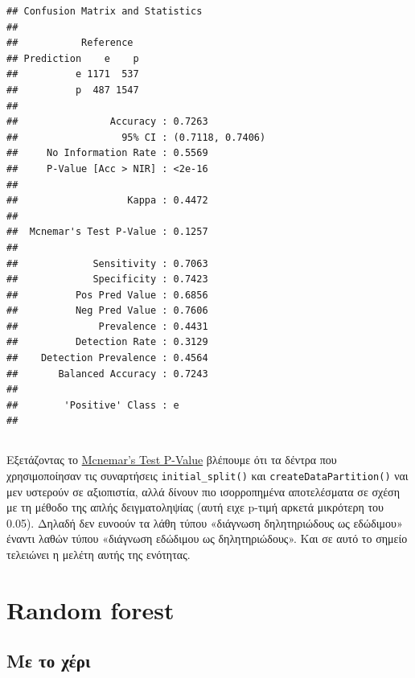 \documentclass[
]{article}
\begin{document}
\begin{verbatim}
## Confusion Matrix and Statistics
## 
##           Reference
## Prediction    e    p
##          e 1171  537
##          p  487 1547
##                                           
##                Accuracy : 0.7263          
##                  95% CI : (0.7118, 0.7406)
##     No Information Rate : 0.5569          
##     P-Value [Acc > NIR] : <2e-16          
##                                           
##                   Kappa : 0.4472          
##                                           
##  Mcnemar's Test P-Value : 0.1257          
##                                           
##             Sensitivity : 0.7063          
##             Specificity : 0.7423          
##          Pos Pred Value : 0.6856          
##          Neg Pred Value : 0.7606          
##              Prevalence : 0.4431          
##          Detection Rate : 0.3129          
##    Detection Prevalence : 0.4564          
##       Balanced Accuracy : 0.7243          
##                                           
##        'Positive' Class : e               
## 
\end{verbatim}

\subsection*{}\label{section-3}

Εξετάζοντας το
\href{https://rasbt.github.io/mlxtend/user_guide/evaluate/mcnemar/}{Mcnemar's
Test P-Value} βλέπουμε ότι τα δέντρα που χρησιμοποίησαν τις συναρτήσεις
\texttt{initial\_split()} και \texttt{createDataPartition()} ναι μεν
υστερούν σε αξιοπιστία, αλλά δίνουν πιο ισορροπημένα αποτελέσματα σε
σχέση με τη μέθοδο της απλής δειγματοληψίας (αυτή ειχε p-τιμή αρκετά
μικρότερη του 0.05). Δηλαδή δεν ευνοούν τα λάθη τύπου «διάγνωση
δηλητηριώδους ως εδώδιμου» έναντι λαθών τύπου «διάγνωση εδώδιμου ως
δηλητηριώδους». Και σε αυτό το σημείο τελειώνει η μελέτη αυτής της
ενότητας.

\section{Random forest}\label{random-forest}

\subsection{Με το
χέρι}\label{ux3bcux3b5-ux3c4ux3bf-ux3c7ux3adux3c1ux3b9}
\end{document}

